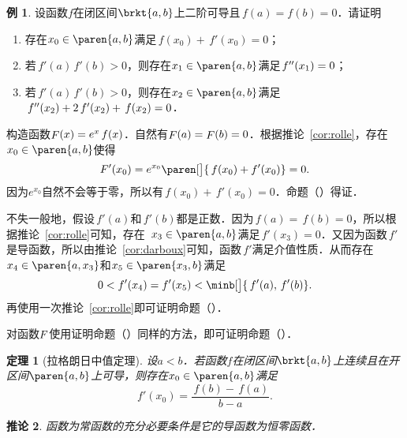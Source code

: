\documentclass[a4paper,punct=CCT]{ctexbook}
\makeatletter
\renewcommand*{\enumparen}[1]{（\makebox[0.6em][c]{\normalfont#1}）}
\newtheorem{theorem}{定理}
\newtheorem{corollary}[theorem]{推论}
\theoremstyle{definition}
\newtheorem*{example*}{例}
\theoremstyle{remark}
\renewcommand*{\proofname}{证}
\renewenvironment{proof}[1][\proofname]{\par
  \pushQED{\qed}%
  \normalfont \topsep6\p@\@plus6\p@\relax
  \trivlist
  \item[\hskip\labelsep
    \bfseries
    #1%
    ]\ignorespaces
}{%
  \popQED\endtrivlist\@endpefalse
}
\makeatother
\begin{document}
\begin{example*}
  设函数\(f\)在闭区间\(\brkt{a,b}\)上二阶可导且\(\,f(a) = f(b) = 0\)．请证明
  \begin{enumerate}
    \renewcommand{\labelenumi}{\enumparen{\arabic{enumi}}}
  \item 存在\(x_0 \in \paren{a,b}\)满足\(\,f(x_0) + \,f'(x_0) = 0\)；
  \item 若\(\,f'(a)\,f'(b) > 0\)，则存在\(x_1 \in \paren{a,b}\)满足\(\,f''(x_1) = 0\)；
  \item 若\(\,f'(a)\,f'(b) > 0\)，则存在\(x_2 \in \paren{a,b}\)满足\(\,f''(x_2) + 2\,f'(x_2) + \,f(x_2) = 0\)．
  \end{enumerate}

  \begin{proof}
    构造函数\(\mathop{\relax F}\nolimits(x) = e^x\,f(x)\)．自然有\(\mathop{\relax F}\nolimits(a) = \mathop{\relax F}\nolimits(b) = 0\)．根据推论~\ref{cor:rolle}，存在\(x_0 \in \paren{a,b}\)使得
    \begin{equation*}
      F'(x_0) = e^{x_0}\paren[\big]{\,f(x_0) + f'(x_0)} = 0.
    \end{equation*}
    因为\(e^{x_0}\)自然不会等于零，所以有\(\,f(x_0) + \,f'(x_0) = 0\)．命题\enumparen{1}得证．

    不失一般地，假设\(\,f'(a)\)和\(\,f'(b)\)都是正数．因为\(\,f(a) = \,f(b) = 0 \)，所以根据推论~\ref{cor:rolle}可知，存在~\(x_3 \in \paren{a,b}\)满足\(\,f'(x_3) = 0\)．又因为函数\(\,f'\!\)是导函数，所以由推论~\ref{cor:darboux}可知，函数\(\,f'\!\)满足介值性质．从而存在\(x_4 \in \paren{a, x_3}\)和\(x_5 \in \paren{x_3, b}\)满足
    \begin{equation*}
      0 < f'(x_4) = f'(x_5) < \minb[\big]{\,f'(a), \,f'(b)}.
    \end{equation*}
    再使用一次推论~\ref{cor:rolle}即可证明命题\enumparen{2}．

    对函数\(\mathop{\relax F}\nolimits\)使用证明命题\enumparen{2}同样的方法，即可证明命题\enumparen{3}．
  \end{proof}
\end{example*}

\begin{theorem}[拉格朗日中值定理]
  \label{thm:lmvt}
  设\(a < b\)．若函数\(f\)在闭区间\(\brkt{a,b}\)上连续且在开区间\(\paren{a,b}\)上可导，则存在\(x_0 \in \paren{a,b}\)满足
  \begin{equation*}
    f'(x_0) = \frac{\,f(b) - \,f(a)}{b-a}.
  \end{equation*}
\end{theorem}

\begin{corollary}
  \label{cor:lmvtconst}
  函数为常函数的充分必要条件是它的导函数为恒零函数．
\end{corollary}
\end{document}
